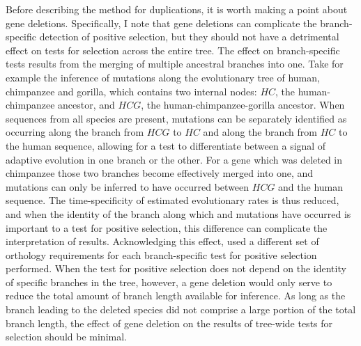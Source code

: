 Before describing the method for duplications, it is worth making a
point about gene deletions. Specifically, I note that gene deletions
can complicate the branch-specific detection of positive selection,
but they should not have a detrimental effect on tests for selection
across the entire tree. The effect on branch-specific tests results
from the merging of multiple ancestral branches into one. Take for
example the inference of mutations along the evolutionary tree of
human, chimpanzee and gorilla, which contains two internal nodes:
$HC$, the human-chimpanzee ancestor, and $HCG$, the
human-chimpanzee-gorilla ancestor. When sequences from all species are
present, mutations can be separately identified as occurring along the
branch from $HCG$ to $HC$ and along the branch from $HC$ to the human
sequence, allowing for a test to differentiate between a signal of
adaptive evolution in one branch or the other. For a gene which was
deleted in chimpanzee those two branches become effectively merged
into one, and mutations can only be inferred to have occurred between
$HCG$ and the human sequence. The time-specificity of estimated
evolutionary rates is thus reduced, and when the identity of the
branch along which \syn and \nsyn mutations have occurred is important
to a test for positive selection, this difference can complicate the
interpretation of results. Acknowledging this effect,
\citet{Kosiol2008} used a different set of orthology requirements for
each branch-specific test for positive selection performed. When the
test for positive selection does not depend on the identity of
specific branches in the tree, however, a gene deletion would only
serve to reduce the total amount of branch length available for
inference. As long as the branch leading to the deleted species did
not comprise a large portion of the total branch length, the effect of
gene deletion on the results of tree-wide tests for selection should
be minimal.

